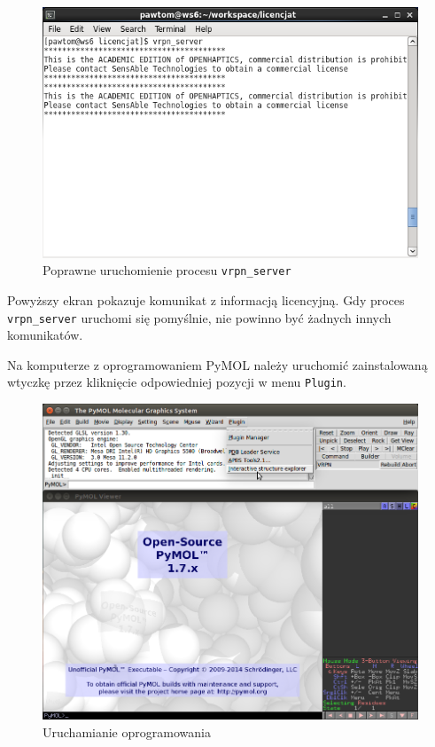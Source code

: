 \documentclass[licencjacka]{pracamgr}
\begin{document}
\begin{figure}[H]
\centering
\includegraphics[scale=0.8,center]{vrpn_start}
\caption{Poprawne uruchomienie procesu \texttt{vrpn\_server}}
\end{figure}

Powyższy ekran pokazuje komunikat z informacją licencyjną. Gdy proces \texttt{vrpn\_server} uruchomi się pomyślnie, nie powinno być żadnych innych komunikatów.

Na komputerze z oprogramowaniem PyMOL należy uruchomić zainstalowaną wtyczkę przez kliknięcie odpowiedniej pozycji w menu \texttt{Plugin}.

\begin{figure}[H]
\centering
\includegraphics[scale=0.5,center]{explorer_run}
\caption{Uruchamianie oprogramowania}
\end{figure}
\end{document}
